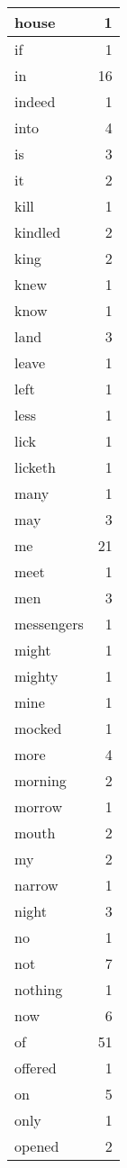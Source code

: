 \begin{center}
\begin{longtable}{l|r}
house & 1\\ \hline 
if & 1\\ \hline 
in & 16\\ \hline 
indeed & 1\\ \hline 
into & 4\\ \hline 
is & 3\\ \hline 
it & 2\\ \hline 
kill & 1\\ \hline 
kindled & 2\\ \hline 
king & 2\\ \hline 
knew & 1\\ \hline 
know & 1\\ \hline 
land & 3\\ \hline 
leave & 1\\ \hline 
left & 1\\ \hline 
less & 1\\ \hline 
lick & 1\\ \hline 
licketh & 1\\ \hline 
many & 1\\ \hline 
may & 3\\ \hline 
me & 21\\ \hline 
meet & 1\\ \hline 
men & 3\\ \hline 
messengers & 1\\ \hline 
might & 1\\ \hline 
mighty & 1\\ \hline 
mine & 1\\ \hline 
mocked & 1\\ \hline 
more & 4\\ \hline 
morning & 2\\ \hline 
morrow & 1\\ \hline 
mouth & 2\\ \hline 
my & 2\\ \hline 
narrow & 1\\ \hline 
night & 3\\ \hline 
no & 1\\ \hline 
not & 7\\ \hline 
nothing & 1\\ \hline 
now & 6\\ \hline 
of & 51\\ \hline 
offered & 1\\ \hline 
on & 5\\ \hline 
only & 1\\ \hline 
opened & 2\\ \hline 

\end{longtable}
\end{center}
